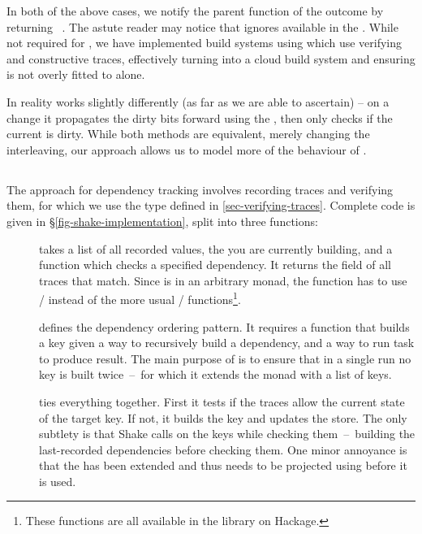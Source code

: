 In both of the above cases, we notify the parent  function of
the outcome by returning ~. The astute reader may notice
that  ignores  available in the .
While not required for \Excel, we have implemented build systems using
 which use verifying and constructive traces, effectively turning
\Excel into a cloud build system and ensuring  is not overly
fitted to \Excel alone.

In reality \Excel works slightly differently (as far as we are able to ascertain) --
on a change it propagates the dirty bits forward using the , then only checks if the current  is dirty. While both methods are equivalent, merely changing the interleaving, our approach allows us to model more of the behaviour of \Excel.

\vspace{-2mm}
\subsection{\Shake}\label{sec-implementation-shake}
\vspace{-1mm}

The \Shake approach for dependency tracking involves recording traces and verifying them, for which we use the  type defined in \ref{sec-verifying-traces}. Complete code is given in \S\ref{fig-shake-implementation}, split into three functions:

\begin{description}
\item[] takes a list of all recorded  values, the  you are currently building, and a function  which checks a specified dependency. It returns the  field of all traces that match. Since  is in an arbitrary monad, the function has to use /\hs{&&^} instead of the more usual /\hs{&&} functions\footnote{These functions are all available in the  library on Hackage.}.
\item[] defines the dependency ordering pattern. It requires a  function that builds a key given a way to recursively build a dependency, and a way to run task to produce result. The main purpose of  is to ensure that in a single run no key is built twice~--~for which it extends the  monad with a list of  keys.
\item[] ties everything together. First it tests if the traces allow the current state of the target key. If not, it builds the key and updates the store. The only subtlety is that Shake calls  on the keys while checking them~--~building the last-recorded dependencies before checking them. One minor annoyance is that the  has been extended and thus needs to be projected using  before it is used.
\end{description}


